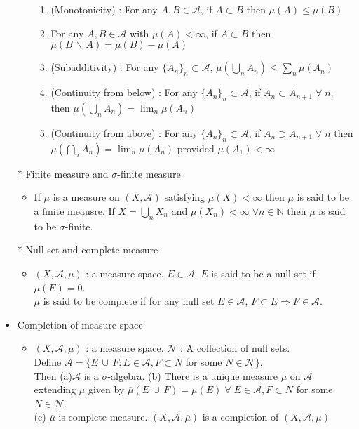 \documentclass[12pt]{article}
\newcommand{\N}{\mathbb{N}}
\newcommand{\A}{\mathcal{A}}
\newcommand{\diff}{\, \backslash \,}
\newcommand{\forany}{\; \forall \;}
\newcommand{\union}{\,\cup\,}
\begin{document}
\begin{itemize}
\begin{itemize}
        \begin{enumerate}
            \item (Monotonicity) : For any $A,B\in \A$, \; if $A\subset B$ then $\mu(A)\leq \mu(B)$
            \item For any $A,B\in \A$ with $\mu(A)<\infty$, \; if $A\subset B$ then $\mu(B \diff A)= \mu(B)-\mu(A)$
            \item (Subadditivity) : For any $\{A_n\}_n \subset \A$, \; $\mu(\bigcup_n A_n)\leq \sum_{n}\mu(A_n)$
            \item (Continuity from below) : For any $\{A_n\}_n \subset \A$, \; if $A_n\subset A_{n+1}\forany n$, then $\mu(\bigcup_n A_n)=\lim_n \mu(A_n)$
            \item (Continuity from above) :  For any $\{A_n\}_n \subset \A$, \; if $A_n\supset A_{n+1}\forany n$ then $\mu(\bigcap_n A_n)=\lim_n \mu(A_n)$ \; provided $\mu(A_1)<\infty$ 
        \end{enumerate}
    \end{itemize}
    \item[*] Finite measure and $\sigma$-finite measure
    \begin{itemize}
        \item If $\mu$ is a measure on $(X,\A)$ satisfying $\mu(X)< \infty $ then $\mu$ is said to be a finite meausre. If $X = \bigcup_n X_n$ and $\mu(X_n)<\infty \; \forall n\in \N$ then $\mu$ is said to be $\sigma$-finite.
    \end{itemize} 
    \item[*] Null set and complete measure
    \begin{itemize}
        \item $(X, \A, \mu)$ : a measure space. $E\in \A$. $E$ is said to be a null set if $\mu(E)=0$. \\$\mu$ is said to be complete if for any null set $E\in \A$, \; $F\subset E \Rightarrow F\in \A$. 
    \end{itemize}
    \item Completion of measure space
    \begin{itemize}
        \item $(X, \A, \mu)$ : a measure space. $\mathcal{N}$ : A collection of null sets. \\Define $\overline{\A}=\{E\union F : E\in \A, F\subset N$ for some $N\in \mathcal{N}\}$. \\Then (a)$\overline{\A}$ is a $\sigma$-algebra. (b) There is a unique measure $\overline{\mu}$ on $\overline{\A}$ extending $\mu$ given by $\overline{\mu}(E\union F)=\mu(E) \forany E\in \A, F\subset N$ for some $N\in \mathcal{N}$. \\(c) $\overline{\mu}$ is complete measure. $(X, \A, \overline{\mu})$ is a completion of $(X, \A, \mu)$ 

\end{itemize}
\end{itemize}
\end{document}
